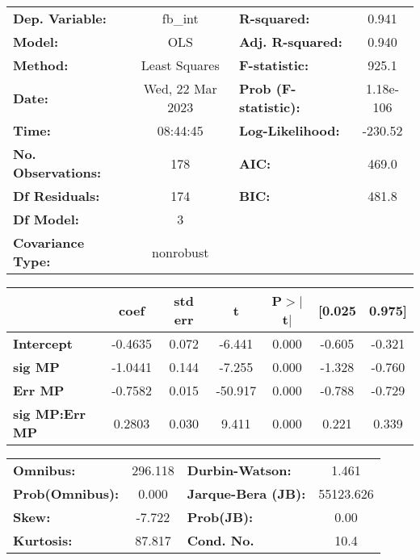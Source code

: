 \begin{center}
\begin{tabular}{lclc}
\toprule
\textbf{Dep. Variable:}    &     fb\_int      & \textbf{  R-squared:         } &     0.941  \\
\textbf{Model:}            &       OLS        & \textbf{  Adj. R-squared:    } &     0.940  \\
\textbf{Method:}           &  Least Squares   & \textbf{  F-statistic:       } &     925.1  \\
\textbf{Date:}             & Wed, 22 Mar 2023 & \textbf{  Prob (F-statistic):} & 1.18e-106  \\
\textbf{Time:}             &     08:44:45     & \textbf{  Log-Likelihood:    } &   -230.52  \\
\textbf{No. Observations:} &         178      & \textbf{  AIC:               } &     469.0  \\
\textbf{Df Residuals:}     &         174      & \textbf{  BIC:               } &     481.8  \\
\textbf{Df Model:}         &           3      & \textbf{                     } &            \\
\textbf{Covariance Type:}  &    nonrobust     & \textbf{                     } &            \\
\bottomrule
\end{tabular}
\end{center}\begin{center}
\begin{tabular}{lcccccc}
\toprule
                       & \textbf{coef} & \textbf{std err} & \textbf{t} & \textbf{P$> |$t$|$} & \textbf{[0.025} & \textbf{0.975]}  \\
\midrule
\textbf{Intercept}     &      -0.4635  &        0.072     &    -6.441  &         0.000        &       -0.605    &       -0.321     \\
\textbf{sig MP}        &      -1.0441  &        0.144     &    -7.255  &         0.000        &       -1.328    &       -0.760     \\
\textbf{Err MP}        &      -0.7582  &        0.015     &   -50.917  &         0.000        &       -0.788    &       -0.729     \\
\textbf{sig MP:Err MP} &       0.2803  &        0.030     &     9.411  &         0.000        &        0.221    &        0.339     \\
\bottomrule
\end{tabular}
\end{center}\begin{center}
\begin{tabular}{lclc}
\toprule
\textbf{Omnibus:}       & 296.118 & \textbf{  Durbin-Watson:     } &     1.461  \\
\textbf{Prob(Omnibus):} &   0.000 & \textbf{  Jarque-Bera (JB):  } & 55123.626  \\
\textbf{Skew:}          &  -7.722 & \textbf{  Prob(JB):          } &      0.00  \\
\textbf{Kurtosis:}      &  87.817 & \textbf{  Cond. No.          } &      10.4  \\
\bottomrule
\end{tabular}
\end{center}